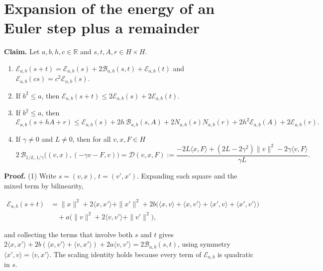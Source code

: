\documentclass[11pt,a4paper]{article}
\begin{document}
\section{\texorpdfstring{Expansion of the energy of an Euler step plus a remainder}{Expansion of the energy of an Euler step plus a remainder}}


\textbf{Claim.} Let \(a,b,h,c\in\mathbb R\) and \(s,t,A,r\in H\times H\).



\begin{enumerate}


\item \(\mathcal E_{a,b}(s+t)=\mathcal E_{a,b}(s)+2\mathcal B_{a,b}(s,t)+\mathcal E_{a,b}(t)\) and \(\mathcal E_{a,b}(cs)=c^2\mathcal E_{a,b}(s)\).

\item If \(b^2\le a\), then \(\mathcal E_{a,b}(s+t)\le2\mathcal E_{a,b}(s)+2\mathcal E_{a,b}(t)\).

\item If \(b^2\le a\), then
\[\mathcal E_{a,b}(s+hA+r)\le\mathcal E_{a,b}(s)+2h\,\mathcal B_{a,b}(s,A)+2N_{a,b}(s)N_{a,b}(r)+2h^2\mathcal E_{a,b}(A)+2\mathcal E_{a,b}(r).\]

\item If \(\gamma\ne0\) and \(L\ne0\), then for all \(v,x,F\in H\)
\[2\,\mathcal B_{1/L,1/\gamma}\bigl((v,x),(-\gamma v-F,v)\bigr)=\mathcal D(v,x,F):=\frac{-2L\langle x,F\rangle+(2L-2\gamma^2)\|v\|^2-2\gamma\langle v,F\rangle}{\gamma L}.\]

\end{enumerate}



\textbf{Proof.} (1) Write \(s=(v,x)\), \(t=(v',x')\). Expanding each square and the mixed term by bilinearity,


\[\begin{aligned}\mathcal E_{a,b}(s+t)&=\|x\|^2+2\langle x,x'\rangle+\|x'\|^2+2b\bigl(\langle x,v\rangle+\langle x,v'\rangle+\langle x',v\rangle+\langle x',v'\rangle\bigr)\\&\quad+a\bigl(\|v\|^2+2\langle v,v'\rangle+\|v'\|^2\bigr),\end{aligned}\]


and collecting the terms that involve both \(s\) and \(t\) gives \(2\langle x,x'\rangle+2b(\langle x,v'\rangle+\langle v,x'\rangle)+2a\langle v,v'\rangle=2\mathcal B_{a,b}(s,t)\), using symmetry \(\langle x',v\rangle=\langle v,x'\rangle\). The scaling identity holds because every term of \(\mathcal E_{a,b}\) is quadratic in \(s\).
\end{document}
